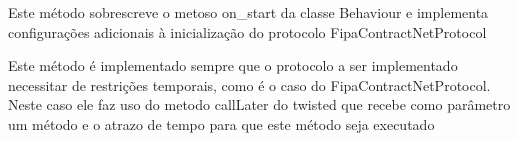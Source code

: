 \documentclass[letterpaper,10pt,brazil]{sphinxmanual}
\begin{document}
\begin{fulllineitems}
\begin{fulllineitems}
\begin{quote}
\begin{description}
\end{description}\end{quote}

\end{fulllineitems}


\begin{fulllineitems}
\label{api:pade.behaviours.protocols.FipaContractNetProtocol.on_start}
Este método sobrescreve o metoso on\_start da classe
Behaviour e implementa configurações adicionais
à inicialização do protocolo FipaContractNetProtocol

\end{fulllineitems}


\begin{fulllineitems}
\label{api:pade.behaviours.protocols.FipaContractNetProtocol.timed_behaviour}
Este método é implementado sempre que o protocolo a ser 
implementado necessitar de restrições temporais, como é
o caso do FipaContractNetProtocol. Neste caso ele faz
uso do metodo callLater do twisted que recebe como 
parâmetro um método e o atrazo de tempo para que este
método seja executado

\end{fulllineitems}


\end{fulllineitems}

\end{document}
